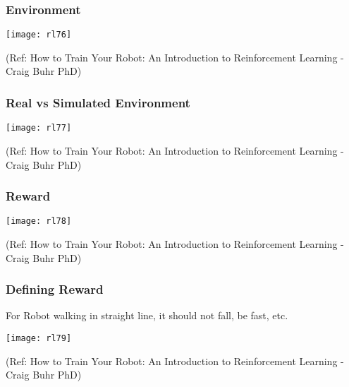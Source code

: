 \begin{frame}[fragile]\frametitle{Environment}


\begin{center}
\texttt{[image: rl76]}
\end{center}

{\tiny (Ref: How to Train Your Robot: An Introduction to Reinforcement Learning - Craig Buhr PhD)}

\end{frame}

\begin{frame}[fragile]\frametitle{Real vs Simulated Environment}


\begin{center}
\texttt{[image: rl77]}
\end{center}

{\tiny (Ref: How to Train Your Robot: An Introduction to Reinforcement Learning - Craig Buhr PhD)}

\end{frame}

\begin{frame}[fragile]\frametitle{Reward}


\begin{center}
\texttt{[image: rl78]}
\end{center}

{\tiny (Ref: How to Train Your Robot: An Introduction to Reinforcement Learning - Craig Buhr PhD)}

\end{frame}

\begin{frame}[fragile]\frametitle{Defining Reward}

For Robot walking in straight line, it should not fall, be fast, etc.

\begin{center}
\texttt{[image: rl79]}
\end{center}

{\tiny (Ref: How to Train Your Robot: An Introduction to Reinforcement Learning - Craig Buhr PhD)}

\end{frame}


